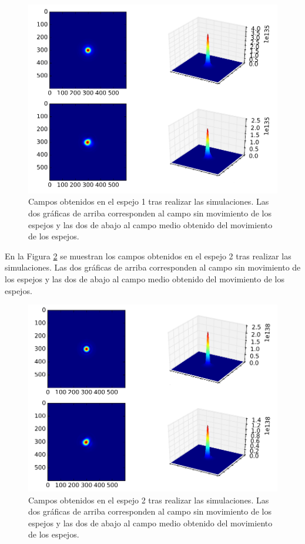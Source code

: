 \documentclass[twoside]{article}
\begin{document}
\begin{multicols}{2}
					\begin{figure}[H]
						\centering
						\includegraphics[scale=0.25]{FiguraEspejo1.png}
						\caption{\label{Img:Espejo1}Campos obtenidos en el espejo 1 tras realizar las simulaciones. Las dos gráficas de arriba corresponden al campo sin movimiento de los espejos y las dos de abajo al campo medio obtenido del movimiento de los espejos.}
					\end{figure}

				En la Figura \ref{Img:Espejo2} se muestran los campos obtenidos en el espejo 2 tras realizar las simulaciones. Las dos gráficas de arriba corresponden al campo sin movimiento de los espejos y las dos de abajo al campo medio obtenido del movimiento de los espejos.

					\begin{figure}[H]
						\centering
						\includegraphics[scale=0.25]{FiguraEspejo2.png}
						\caption{\label{Img:Espejo2}Campos obtenidos en el espejo 2 tras realizar las simulaciones. Las dos gráficas de arriba corresponden al campo sin movimiento de los espejos y las dos de abajo al campo medio obtenido del movimiento de los espejos.}
					\end{figure}


\end{multicols}
\end{document}
